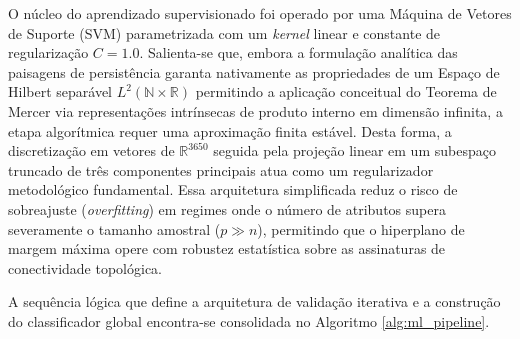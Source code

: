 \documentclass[12pt, a4paper]{article}
\theoremstyle{plain}
\theoremstyle{definition}
\theoremstyle{remark}
\newcommand{\ident}{\hspace{2em}}
\begin{document}
\ident O núcleo do aprendizado supervisionado foi operado por uma Máquina de Vetores de Suporte (SVM) parametrizada com um \textit{kernel} linear e constante de regularização $C=1.0$. Salienta-se que, embora a formulação analítica das paisagens de persistência garanta nativamente as propriedades de um Espaço de Hilbert separável $L^2(\mathbb{N} \times \mathbb{R})$ permitindo a aplicação conceitual do Teorema de Mercer via representações intrínsecas de produto interno em dimensão infinita, a etapa algorítmica requer uma aproximação finita estável. Desta forma, a discretização em vetores de $\mathbb{R}^{3650}$ seguida pela projeção linear em um subespaço truncado de três componentes principais atua como um regularizador metodológico fundamental. Essa arquitetura simplificada reduz o risco de sobreajuste (\textit{overfitting}) em regimes onde o número de atributos supera severamente o tamanho amostral ($p \gg n$), permitindo que o hiperplano de margem máxima opere com robustez estatística sobre as assinaturas de conectividade topológica.

\ident A sequência lógica que define a arquitetura de validação iterativa e a construção do classificador global encontra-se consolidada no Algoritmo \ref{alg:ml_pipeline}.
\end{document}
